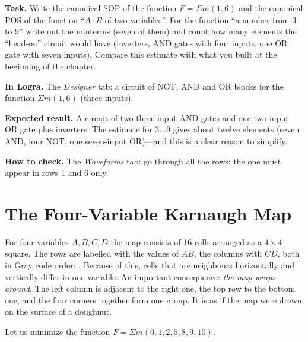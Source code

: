 \begin{diybox}
\textbf{Task.}  Write the canonical SOP of the function
$F=\Sigma m(1,6)$ and the canonical POS of the function ``$A\cdot B$ of two
variables''.  For the function ``a number from 3 to 9'' write out the
minterms (seven of them) and count how many elements the ``head-on'' circuit
would have (inverters, AND gates with four inputs, one OR gate with seven
inputs).  Compare this estimate with what you built at the beginning
of the chapter.

\textbf{In Logra.} The \emph{Designer} tab: a circuit of NOT, AND and OR
blocks for the function $\Sigma m(1,6)$ (three inputs).

\textbf{Expected result.} A circuit of two three-input AND gates and one
two-input OR gate plus inverters. The estimate for $3\ldots 9$ gives about
twelve elements (seven AND, four NOT, one seven-input OR)---and this is
a clear reason to simplify.

\textbf{How to check.} The \emph{Waveforms} tab: go through all the rows; the
one must appear in rows 1 and 6 only.
\end{diybox}

\section{The Four-Variable Karnaugh Map}

For four variables $A,B,C,D$ the map consists of 16 cells arranged as a
$4\times 4$ square. The rows are labelled with the values of $AB$, the columns
with $CD$, both in Gray code order: . Because of this,
cells that are neighbours horizontally and vertically differ in one variable.
An important consequence: \emph{the map wraps around}. The left column is
adjacent to the right one, the top row to the bottom one, and the four
corners together form one group. It is as if the map were drawn on the
surface of a doughnut.

Let us minimize the function $F = \Sigma m(0,1,2,5,8,9,10)$.

